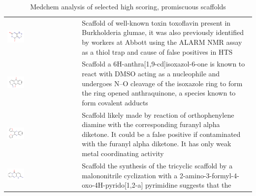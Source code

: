 \begin{table}
\caption{Medchem analysis of selected high scoring, promiscuous scaffolds}
\begin{tabular}{p{0.3\linewidth}p{0.7\linewidth}}
\hline
\includegraphics[align=t,width=0.25\textwidth]{data/badapple/medchem_01.png} & Scaffold of well-known toxin toxoflavin present in Burkholderia glumae, it was also previously identified by workers at Abbott using the ALARM NMR assay as a thiol trap and cause of false positives in HTS\cite{Huth2007-kc} \\
\includegraphics[align=t,width=0.25\textwidth]{data/badapple/medchem_02.png} & Scaffold a 6H-anthra[1,9-cd]isoxazol-6-one is known to react with DMSO acting as a nucleophile and undergoes N–O cleavage of the isoxazole ring to form the ring opened anthraquinone, a species known to form covalent adducts\cite{Sutter1982-qu} \\
\includegraphics[align=t,width=0.25\textwidth]{data/badapple/medchem_03.png} & Scaffold likely made by reaction of orthophenylene diamine with the corresponding furanyl alpha diketone. It could be a false positive if contaminated with the furanyl alpha diketone. It has only weak metal coordinating activity \\
\includegraphics[align=t,width=0.25\textwidth]{data/badapple/medchem_04.png} & Scaffold the synthesis of the tricyclic scaffold by a malononitrile cyclization with a 2-amino-3-formyl-4-oxo-4H-pyrido[1,2-a] pyrimidine suggests that the

\end{tabular}
\end{table}
